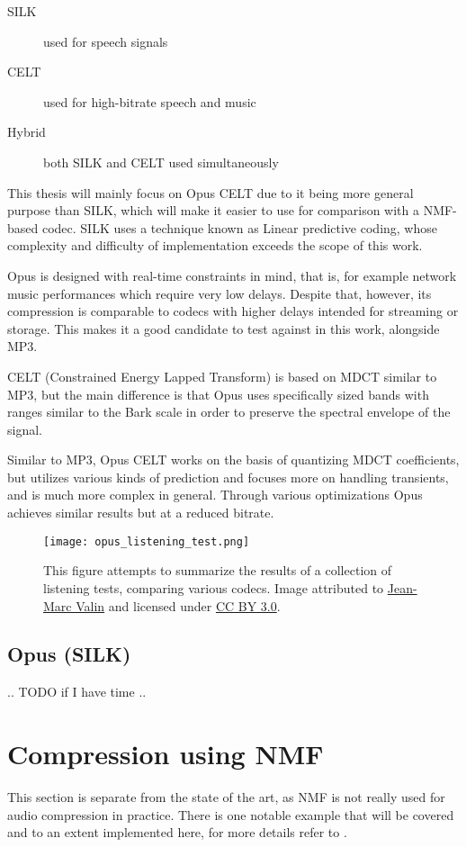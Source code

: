 \begin{description}
	\item[SILK] used for speech signals
	\item[CELT] used for high-bitrate speech and music
	\item[Hybrid] both SILK and CELT used simultaneously
\end{description}

This thesis will mainly focus on Opus CELT due to it being more general purpose than SILK, which will make it easier to use for comparison with a NMF-based codec. SILK uses a technique known as Linear predictive coding, whose complexity and difficulty of implementation exceeds the scope of this work.

Opus is designed with real-time constraints in mind, that is, for example network music performances which require very low delays. Despite that, however, its compression is comparable to codecs with higher delays intended for streaming or storage. This makes it a good candidate to test against in this work, alongside MP3.

CELT (Constrained Energy Lapped Transform) is based on MDCT similar to MP3, but the main difference is that Opus uses specifically sized bands with ranges similar to the Bark scale in order to preserve the spectral envelope of the signal.

Similar to MP3, Opus CELT works on the basis of quantizing MDCT coefficients, but utilizes various kinds of prediction and focuses more on handling transients, and is much more complex in general. Through various optimizations Opus achieves similar results but at a reduced bitrate.

\begin{figure}[ht]
	\caption[Comparison of various codecs]{This figure attempts to summarize the results of a collection of listening tests, comparing various codecs. Image attributed to \href{http://opus-codec.org/comparison/}{Jean-Marc Valin} and licensed under \href{https://creativecommons.org/licenses/by/3.0/}{CC BY 3.0}.}
	\centering
	\texttt{[image: opus\_listening\_test.png]}
\end{figure}

\subsection{Opus (SILK)}
.. TODO if I have time ..

\section{Compression using NMF}
This section is separate from the state of the art, as NMF is not really used for audio compression in practice. There is one notable example that will be covered and to an extent implemented here, for more details refer to \cite{nikunen_2010}.

